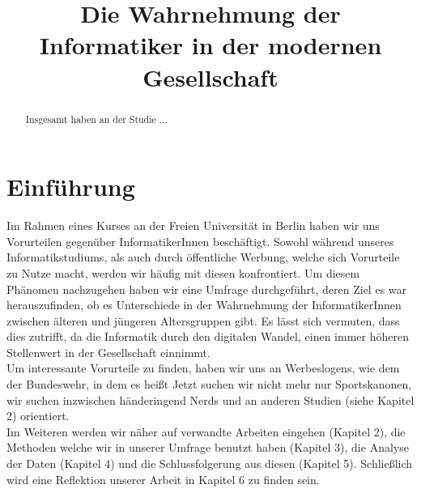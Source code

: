 \documentclass[de]{agse-empir-report}\usepackage[]{graphicx}\usepackage[]{color}
\begin{document}
\title{Die Wahrnehmung der Informatiker in der modernen Gesellschaft}
\author{
    \and
    \and
}

\maketitle


\begin{abstract}
    Insgesamt haben an der Studie ...
\end{abstract}


\section[jk]{Einführung}

Im Rahmen eines Kurses an der Freien Universität in Berlin haben wir uns Vorurteilen gegenüber InformatikerInnen beschäftigt. Sowohl während unseres Informatikstudiums, als auch durch öffentliche Werbung, welche sich Vorurteile zu Nutze macht, werden wir häufig mit diesen konfrontiert.
Um diesem Phänomen nachzugehen haben wir eine Umfrage durchgeführt, deren Ziel es war herauszufinden, ob es Unterschiede in der Wahrnehmung der InformatikerInnen zwischen älteren und jüngeren Altersgruppen gibt. Es lässt sich vermuten, dass dies zutrifft, da die Informatik durch den digitalen Wandel, einen immer höheren Stellenwert in der Gesellschaft einnimmt.\\
Um interessante Vorurteile zu finden, haben wir uns an Werbeslogens, wie dem der Bundeswehr, in dem es heißt \glqq Jetzt suchen wir nicht mehr nur Sportskanonen, wir suchen inzwischen händeringend Nerds \grqq \cite{Bundeswehr} und an anderen Studien (siehe Kapitel 2) orientiert. \\
Im Weiteren werden wir näher auf verwandte Arbeiten eingehen (Kapitel 2), die Methoden welche wir in unserer Umfrage benutzt haben (Kapitel 3), die Analyse der Daten (Kapitel 4) und die Schlussfolgerung aus diesen (Kapitel 5). Schließlich wird eine Reflektion unserer Arbeit in Kapitel 6 zu finden sein.
\end{document}
